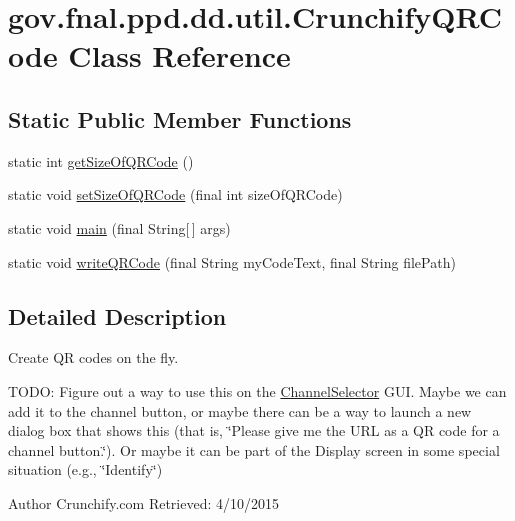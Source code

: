 \hypertarget{classgov_1_1fnal_1_1ppd_1_1dd_1_1util_1_1CrunchifyQRCode}{\section{gov.\-fnal.\-ppd.\-dd.\-util.\-Crunchify\-Q\-R\-Code Class Reference}
\label{classgov_1_1fnal_1_1ppd_1_1dd_1_1util_1_1CrunchifyQRCode}
}
\subsection*{Static Public Member Functions}
\begin{DoxyCompactItemize}
\item 
static int \hyperlink{classgov_1_1fnal_1_1ppd_1_1dd_1_1util_1_1CrunchifyQRCode_a6bf970fcb89f16adf68d1ea7e470eb15}{get\-Size\-Of\-Q\-R\-Code} ()
\item 
static void \hyperlink{classgov_1_1fnal_1_1ppd_1_1dd_1_1util_1_1CrunchifyQRCode_ae71b2f8f878b6cd6c9e090104d91a28f}{set\-Size\-Of\-Q\-R\-Code} (final int size\-Of\-Q\-R\-Code)
\item 
static void \hyperlink{classgov_1_1fnal_1_1ppd_1_1dd_1_1util_1_1CrunchifyQRCode_a46e2a30a4ce50a4c4424cd2d1d42ab6a}{main} (final String\mbox{[}$\,$\mbox{]} args)
\item 
static void \hyperlink{classgov_1_1fnal_1_1ppd_1_1dd_1_1util_1_1CrunchifyQRCode_af3ad34bec90ccd331cab5adf934be15e}{write\-Q\-R\-Code} (final String my\-Code\-Text, final String file\-Path)
\end{DoxyCompactItemize}


\subsection{Detailed Description}
Create Q\-R codes on the fly.

T\-O\-D\-O\-: Figure out a way to use this on the \hyperlink{classgov_1_1fnal_1_1ppd_1_1dd_1_1ChannelSelector}{Channel\-Selector} G\-U\-I. Maybe we can add it to the channel button, or maybe there can be a way to launch a new dialog box that shows this (that is, \char`\"{}\-Please give me the U\-R\-L as a Q\-R code for a channel button.\char`\"{}). Or maybe it can be part of the Display screen in some special situation (e.\-g., \char`\"{}\-Identify\char`\"{})

\begin{DoxyAuthor}{Author}
Crunchify.\-com Retrieved\-: 4/10/2015 
\end{DoxyAuthor}


